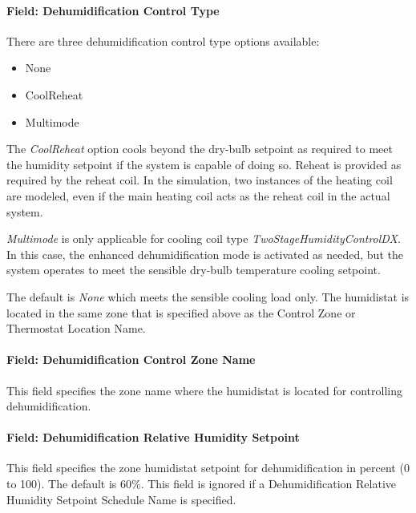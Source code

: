 \paragraph{Field: Dehumidification Control Type}\label{field-dehumidification-control-type-2}

There are three dehumidification control type options available:

\begin{itemize}
\item
  None
\item
  CoolReheat
\item
  Multimode
\end{itemize}

The \emph{CoolReheat} option cools beyond the dry-bulb setpoint as required to meet the humidity setpoint if the system is capable of doing so. Reheat is provided as required by the reheat coil. In the simulation, two instances of the heating coil are modeled, even if the main heating coil acts as the reheat coil in the actual system.

\emph{Multimode} is only applicable for cooling coil type \emph{TwoStageHumidityControlDX}. In this case, the enhanced dehumidification mode is activated as needed, but the system operates to meet the sensible dry-bulb temperature cooling setpoint.

The default is \emph{None} which meets the sensible cooling load only. The humidistat is located in the same zone that is specified above as the Control Zone or Thermostat Location Name.

\paragraph{Field: Dehumidification Control Zone Name}\label{field-dehumidification-control-zone-name-1}

This field specifies the zone name where the humidistat is located for controlling dehumidification.

\paragraph{Field: Dehumidification Relative Humidity Setpoint}\label{field-dehumidification-relative-humidity-setpoint}

This field specifies the zone humidistat setpoint for dehumidification in percent (0 to 100). The default is 60\%. This field is ignored if a Dehumidification Relative Humidity Setpoint Schedule Name is specified.

